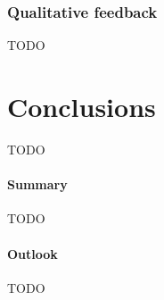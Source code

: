 \documentclass{PDS}
\begin{document}
\subsubsection{Qualitative feedback}
\label{sec:qualitative}

TODO

\section{Conclusions}
\label{sec:conclusion}

TODO

\paragraph{Summary}

TODO

\paragraph{Outlook}

TODO

\begin{Backmatter}




\end{Backmatter}
\end{document}
